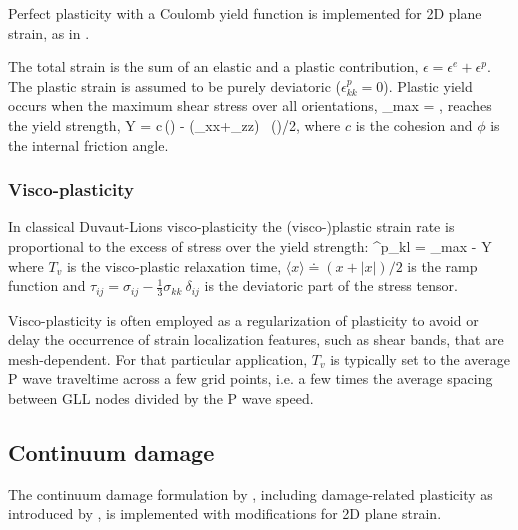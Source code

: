 Perfect plasticity with a Coulomb yield function is implemented
for 2D plane strain, as in .

The total strain is the sum of an elastic and a plastic contribution,
$\epsilon = \epsilon^e + \epsilon^p$.
The plastic strain is assumed to be purely deviatoric ($\epsilon^p_{kk} = 0$).
Plastic yield occurs when
the maximum shear stress over all orientations,
\eq
  \tau_{max} = ,
\en
reaches the yield strength,
\eq
  Y = c\,\cos(\phi) - (\sigma_{xx}+\sigma_{zz}) \, \sin(\phi)/2,
\en
where $c$ is the cohesion and $\phi$ is the internal friction angle.

\subsubsection{Visco-plasticity}

In classical Duvaut-Lions visco-plasticity the (visco-)plastic strain rate is proportional
to the excess of stress over the yield strength:
\eq
  \dot{\epsilon}^p_{kl} =  \langle\tau_{max} - Y\rangle\ 
\en
where $T_v$ is the visco-plastic relaxation time,
$\langle x\rangle \doteq (x+|x|)/2$ is the ramp function
and $\tau_{ij} = \sigma_{ij} - \frac{1}{3}\sigma_{kk}\ \delta_{ij}$ 
is the deviatoric part of the stress tensor.

Visco-plasticity is often employed as a regularization of plasticity
to avoid or delay the occurrence of strain localization features,
such as shear bands, that are mesh-dependent.
For that particular application, $T_v$ is typically set to 
the average P wave traveltime across a few grid points, 
i.e. a few times the average spacing between GLL nodes divided by the P wave speed.

\subsection{Continuum damage}

The continuum damage formulation by , 
including damage-related plasticity as introduced by ,
is implemented with modifications for 2D plane strain.

